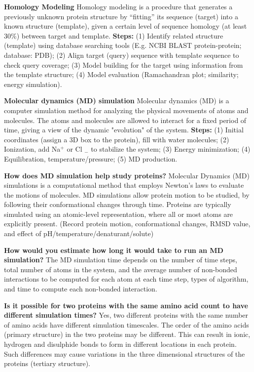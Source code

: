 \vspace{0.1em}\noindent
\textbf{Homology Modeling} Homology modeling is a procedure that generates a previously unknown protein structure by “fitting” its sequence (target) into a known structure (template), given a certain level of sequence homology (at least 30\%) between target and template. \textbf{Steps:} (1) Identify related structure (template) using database searching tools (E.g. NCBI BLAST protein-protein; database: PDB); (2) Align target (query) sequence with template sequence to check query coverage; (3) Model building for the target using information from the template structure; (4) Model evaluation (Ramachandran plot; similarity; energy simulation).

\vspace{0.1em}\noindent
\textbf{Molecular dynamics (MD) simulation} Molecular dynamics (MD) is a computer simulation method for analyzing the physical movements of atoms and molecules. The atoms and molecules are allowed to interact for a fixed period of time, giving a view of the dynamic "evolution" of the system. \textbf{Steps: } (1) Initial coordinates (assign a 3D box to the protein), fill with water molecules; (2) Ionization, add Na$^+$ or Cl $_-$ to stabilize the system; (3) Energy minimization; (4) Equilibration, temperature/pressure; (5) MD production.

\vspace{0.1em}\noindent
\textbf{How does MD simulation help study proteins?} Molecular Dynamics (MD) simulations is a computational method that employs Newton's laws to evaluate the motions of molecules. MD simulations allow protein motion to be studied, by following their conformational changes through time. Proteins are typically simulated using an atomic-level representation, where all or most atoms are explicitly present. (Record protein motion, conformational changes, RMSD value, and effect of pH/temperature/denaturant/solute)

\vspace{0.1em}\noindent
\textbf{How would you estimate how long it would take to run an MD simulation?} The MD simulation time depends on the number of time steps, total number of atoms in the system, and the average number of non-bonded interactions to be computed for each atom at each time step, types of algorithm, and time to compute each non-bonded interaction.

\vspace{0.1em}\noindent
\textbf{Is it possible for two proteins with the same amino acid count to have different simulation times?} Yes, two different proteins with the same number of amino acids have different simulation timescales. The order of the amino acids (primary structure) in the two proteins may be different. This can result in ionic, hydrogen and disulphide bonds to form in different locations in each protein. Such differences may cause variations in the three dimensional structures of the proteins (tertiary structure).

